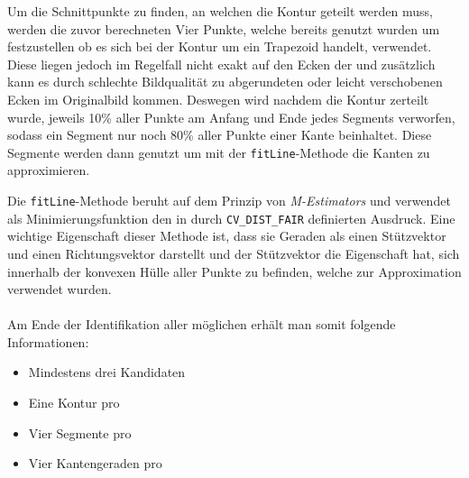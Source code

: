 Um die Schnittpunkte zu finden, an welchen die Kontur geteilt werden muss, werden die zuvor berechneten Vier Punkte, welche bereits genutzt wurden um festzustellen ob es sich bei der Kontur um ein Trapezoid handelt, verwendet. Diese liegen jedoch im Regelfall nicht exakt auf den Ecken der \fps und zusätzlich kann es durch schlechte Bildqualität zu abgerundeten oder leicht verschobenen Ecken im Originalbild kommen. Deswegen wird nachdem die Kontur zerteilt wurde, jeweils 10\% aller Punkte am Anfang und Ende jedes Segments verworfen, sodass ein Segment nur noch 80\% aller Punkte einer Kante beinhaltet. Diese Segmente werden dann genutzt um mit der \texttt{fitLine}-Methode die Kanten zu approximieren.

Die \texttt{fitLine}-Methode beruht auf dem Prinzip von \emph{M-Estimators} und verwendet als Minimierungsfunktion den in \OpenCV durch \texttt{CV\_DIST\_FAIR} definierten Ausdruck. Eine wichtige Eigenschaft dieser Methode ist, dass sie Geraden als einen Stützvektor und einen Richtungsvektor darstellt und der Stützvektor die Eigenschaft hat, sich innerhalb der konvexen Hülle aller Punkte zu befinden, welche zur Approximation verwendet wurden.
\\\\
Am Ende der Identifikation aller möglichen \fps erhält man somit folgende Informationen:
\begin{itemize}
	\item Mindestens drei \fp Kandidaten
	\item Eine Kontur pro \fp
	\item Vier Segmente pro \fp
	\item Vier Kantengeraden pro \fp
\end{itemize}